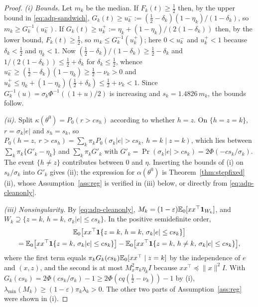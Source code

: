\begin{proof}
\emph{(i) Bounds.} Let $m_k$ be the median. If $F_k(t)\ge\tfrac12$ then, by the upper
bound in \eqref{eq:adp-sandwich}, $G_k(t)\ge u^{-}_k:=(\tfrac12-\delta_k)(1-\eta_k)/(1-\delta_k)$,
so $m_k\ge G_k^{-1}(u^{-}_k)$. If $G_k(t)\ge u^{+}_k:=\eta_k+(1-\eta_k)/(2(1-\delta_k))$ then,
by the lower bound, $F_k(t)\ge\tfrac12$, so $m_k\le G_k^{-1}(u^{+}_k)$; here $0<u^{-}_k$ and
$u^{+}_k<1$ because $\delta_k<\tfrac12$ and $\eta_k<1$. Now
$(\tfrac12-\delta_k)/(1-\delta_k)\ge\tfrac12-\delta_k$ and
$1/(2(1-\delta_k))\le\tfrac12+\delta_k$ for $\delta_k\le\tfrac12$, whence
$u^{-}_k\ge(\tfrac12-\delta_k)(1-\eta_k)\ge\tfrac12-\nu_k>0$ and
$u^{+}_k\le\eta_k+(1-\eta_k)(\tfrac12+\delta_k)\le\tfrac12+\nu_k<1$. Since
$G_k^{-1}(u)=\sigma_k\Phi^{-1}((1+u)/2)$ is increasing and $s_k=1.4826\,m_k$, the bounds
follow.

\emph{(ii).} Split $\kappa(\theta^{0})=P_0(r>cs_h)$ according to whether $h=z$. On
$\{h=z=k\}$, $r=\sigma_k|e|$ and $s_h=s_k$, so
$P_0(h=z,\ r>cs_h)=\sum_k\pi_kP_0(\sigma_k|e|>cs_k,\ h=k\mid z=k)$, which lies between
$\sum_k\pi_k\{G'_k-\eta_k\}$ and $\sum_k\pi_kG'_k$ with
$G'_k=\Pr(\sigma_k|e|>cs_k)=2\Phi(-cs_k/\sigma_k)$. The event $\{h\ne z\}$ contributes
between $0$ and $\eta$. Inserting the bounds of (i) on $s_k/\sigma_k$ into $G'_k$ gives
(ii); the expression for $\alpha(\theta^{0})$ is Theorem~\ref{thm:stepfixed}(ii), whose
Assumption~\ref{ass:reg} is verified in (iii) below, or directly from
\eqref{eq:adp-cleanonly}.

\emph{(iii) Nonsingularity.} By \eqref{eq:adp-cleanonly},
$M_k=(1-\varepsilon)\mathbb{E}_0[xx^{\top}\mathbf{1}_{W_k}]$, and $W_k\supseteq\{z=k,\,h=k,\,\sigma_k|e|\le cs_k\}$.
In the positive semidefinite order,
\begin{multline*}
\mathbb{E}_0\bigl[xx^{\top}\mathbf{1}\{z=k,\,h=k,\,\sigma_k|e|\le cs_k\}\bigr]\\
=\mathbb{E}_0\bigl[xx^{\top}\mathbf{1}\{z=k,\,\sigma_k|e|\le cs_k\}\bigr]
-\mathbb{E}_0\bigl[xx^{\top}\mathbf{1}\{z=k,\,h\ne k,\,\sigma_k|e|\le cs_k\}\bigr],
\end{multline*}
where the first term equals $\pi_kG_k(cs_k)\mathbb{E}_0[xx^{\top}\mid z=k]$ by the independence of
$e$ and $(x,z)$, and the second is at most $M_x^{2}\pi_k\eta_kI$ because
$xx^{\top}\preceq\|x\|^{2}I$. With $G_k(cs_k)=2\Phi(cs_k/\sigma_k)-1\ge2\Phi(cq(\tfrac12-\nu_k))-1$
by (i), $\lambda_{\min}(M_k)\ge(1-\varepsilon)\pi_k\lambda_k>0$. The other two parts of
Assumption~\ref{ass:reg} were shown in (i).


\end{proof}
